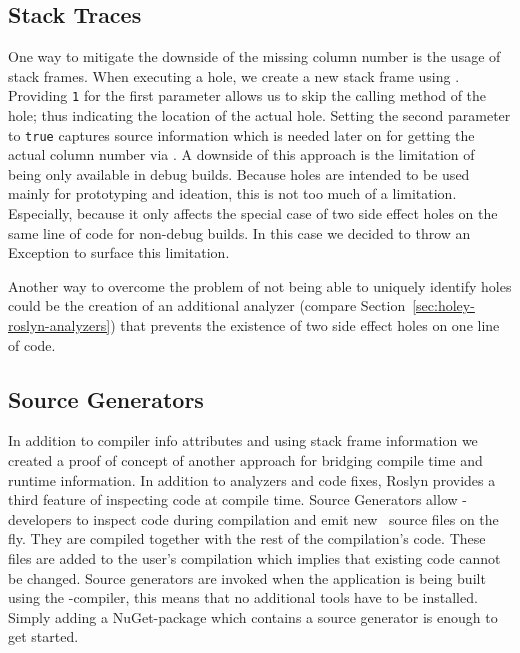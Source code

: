 \subsection{Stack Traces}
\label{sec:holey-stack-traces}
One way to mitigate the downside of the missing column number is the usage of stack frames.
When executing a hole, we create a new stack frame using \texttt{}.
Providing \verb|1| for the first parameter allows us to skip the calling method of the hole; thus indicating the location of the actual hole.
Setting the second parameter to \verb|true| captures source information which is needed later on for getting the actual column number via \texttt{}.
A downside of this approach is the limitation of being only available in debug builds.
Because holes are intended to be used mainly for prototyping and ideation, this is not too much of a limitation.
Especially, because it only affects the special case of two side effect holes on the same line of code for non-debug builds.
In this case we decided to throw an Exception to surface this limitation.

Another way to overcome the problem of not being able to uniquely identify holes could be the creation of an additional analyzer (compare Section~\ref{sec:holey-roslyn-analyzers}) that prevents the existence of two side effect holes on one line of code.


\subsection{Source Generators}
\label{sec:source-generators}
In addition to compiler info attributes and using stack frame information we created a proof of concept of another approach for bridging compile time and runtime information.
In addition to analyzers and code fixes, Roslyn provides a third feature of inspecting code at compile time.
Source Generators \cite{microsoft_source_2023} allow \CS-developers to inspect code during compilation and emit new \CS\ source files on the fly.
They are compiled together with the rest of the compilation's code.
These files are added to the user's compilation which implies that existing code cannot be changed.
Source generators are invoked when the application is being built using the \CS-compiler, this means that no additional tools have to be installed.
Simply adding a NuGet-package which contains a source generator is enough to get started. 

